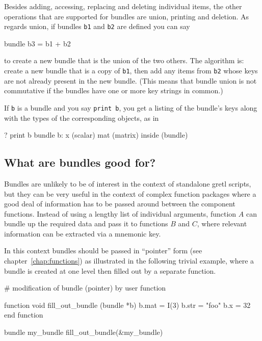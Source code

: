 Besides adding, accessing, replacing and deleting individual items,
the other operations that are supported for bundles are union,
printing and deletion. As regards union, if bundles \texttt{b1} and
\texttt{b2} are defined you can say

\begin{code}
bundle b3 = b1 + b2
\end{code}

to create a new bundle that is the union of the two others. The
algorithm is: create a new bundle that is a copy of \texttt{b1}, then
add any items from \texttt{b2} whose keys are not already present in
the new bundle. (This means that bundle union is not commutative if
the bundles have one or more key strings in common.)

If \texttt{b} is a bundle and you say \texttt{print b}, you get a
listing of the bundle's keys along with the types of the corresponding
objects, as in

\begin{code}
? print b
bundle b:
 x (scalar)
 mat (matrix)
 inside (bundle)
\end{code}

\subsection{What are bundles good for?}

Bundles are unlikely to be of interest in the context of standalone
gretl scripts, but they can be very useful in the context of
complex function packages where a good deal of information has to be
passed around between the component functions. Instead of using a
lengthy list of individual arguments, function $A$ can bundle up the
required data and pass it to functions $B$ and $C$, where relevant
information can be extracted via a mnemonic key.

In this context bundles should be passed in ``pointer'' form
(see chapter~\ref{chap:functions}) as illustrated in the following
trivial example, where a bundle is created at one level then filled
out by a separate function.

\begin{code}
# modification of bundle (pointer) by user function

function void fill_out_bundle (bundle *b)
  b.mat =  I(3)
  b.str = "foo"
  b.x = 32
end function

bundle my_bundle 
fill_out_bundle(&my_bundle)
\end{code}


